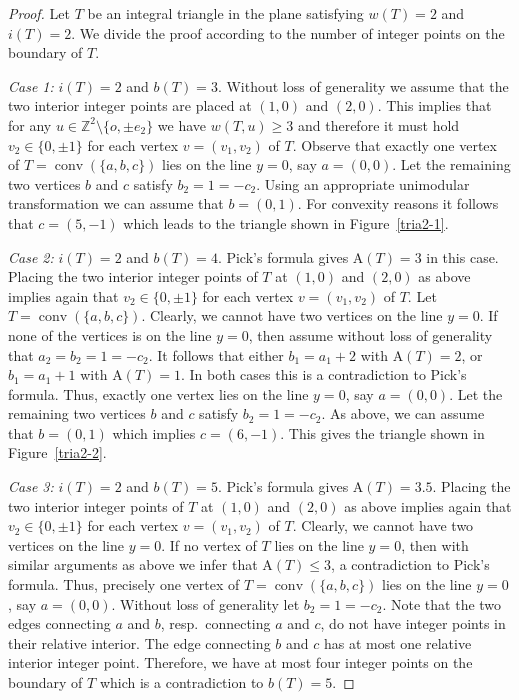 \documentclass[a4paper]{article}
\theoremstyle{plain}
\begin{document}
\begin{proof}
Let $T$ be an integral triangle in the plane satisfying
$w(T) = 2$ and $i(T) = 2$.
We divide the proof according to the number of integer
points on the boundary of $T$.

\emph{Case 1:} $i(T) = 2$ and $b(T) = 3$. 
Without loss of generality we assume that the two interior
integer points are placed at $(1,0)$ and $(2,0)$.
This implies that for any $u \in {\mathbb{Z}}^2 \setminus \{o, \pm
e_2\}$ we have $w(T,u) \geq 3$ and therefore it must hold
$v_2 \in \{0, \pm 1\}$ for each vertex $v = (v_1, v_2)$ of
$T$.
Observe that exactly one vertex of $T = {{\mathop{\mathrm{{conv}}}}}(\{a,b,c\})$
lies on the line $y = 0$, say $a = (0,0)$.
Let the remaining two vertices $b$ and $c$ satisfy $b_2 = 1
= - c_2$.
Using an appropriate unimodular transformation we can assume
that $b = (0,1)$.
For convexity reasons it follows that $c = (5,-1)$ which
leads to the triangle shown in Figure~\ref{tria2-1}.

\emph{Case 2:} $i(T) = 2$ and $b(T) = 4$.
Pick's formula gives ${\mathrm{A}}(T) = 3$ in this case.
Placing the two interior integer points of $T$ at $(1,0)$
and $(2,0)$ as above implies again that $v_2 \in \{0, \pm
1\}$ for each vertex $v = (v_1, v_2)$ of $T$.
Let $T = {{\mathop{\mathrm{{conv}}}}}(\{a,b,c\})$.
Clearly, we cannot have two vertices on the line $y = 0$.
If none of the vertices is on the line $y = 0$, then assume
without loss of generality that $a_2 = b_2 = 1 = - c_2$.
It follows that either $b_1 = a_1 + 2$ with ${\mathrm{A}}(T) = 2$,
or $b_1 = a_1 + 1$ with ${\mathrm{A}}(T) = 1$.
In both cases this is a contradiction to Pick's formula.
Thus, exactly one vertex lies on the line $y = 0$, say $a =
(0,0)$.
Let the remaining two vertices $b$ and $c$ satisfy $b_2 = 1
= - c_2$.
As above, we can assume that $b = (0,1)$ which implies $c =
(6,-1)$.
This gives the triangle shown in Figure~\ref{tria2-2}.

\emph{Case 3:} $i(T) = 2$ and $b(T) = 5$.
Pick's formula gives ${\mathrm{A}}(T) = 3{.}5$.
Placing the two interior integer points of $T$ at $(1,0)$
and $(2,0)$ as above implies again that $v_2 \in \{0, \pm
1\}$ for each vertex $v = (v_1, v_2)$ of $T$.
Clearly, we cannot have two vertices on the line $y = 0$.
If no vertex of $T$ lies on the line $y = 0$, then with
similar arguments as above we infer that ${\mathrm{A}}(T) \leq 3$,
a contradiction to Pick's formula.
Thus, precisely one vertex of $T = {{\mathop{\mathrm{{conv}}}}}(\{a,b,c\})$ lies on
the line $y = 0$, say $a = (0,0)$.
Without loss of generality let $b_2 = 1 = - c_2$.
Note that the two edges connecting $a$ and $b$,
resp.~connecting $a$ and $c$, do not have integer points in
their relative interior.
The edge connecting $b$ and $c$ has at most one relative
interior integer point.
Therefore, we have at most four integer points on the
boundary of $T$ which is a contradiction to $b(T) = 5$.


\end{proof}
\end{document}
